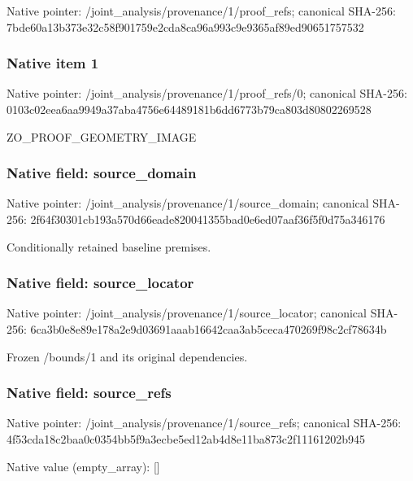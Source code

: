 \documentclass[10pt,a4paper]{article}
\begin{document}
Native pointer: /joint\_analysis/provenance/1/proof\_refs; canonical SHA-256: 7bde60a13b373e32c58f9017\allowbreak{}59e2cda8ca96a993c9e9365a\allowbreak{}f89ed90651757532



\subsubsection{Native item 1}


Native pointer: /joint\_analysis/provenan\allowbreak{}ce/1/proof\_refs/0; canonical SHA-256: 0103c02eea6aa9949a37aba4\allowbreak{}756e64489181b6dd6773b79c\allowbreak{}a803d80802269528


ZO\_PROOF\_GEOMETRY\_IMAGE


\subsubsection{Native field: source\_domain}


Native pointer: /joint\_analysis/provenan\allowbreak{}ce/1/source\_domain; canonical SHA-256: 2f64f30301cb193a570d66ea\allowbreak{}de820041355bad0e6ed07aaf\allowbreak{}36f5f0d75a346176


Conditionally retained baseline premises.


\subsubsection{Native field: source\_locator}


Native pointer: /joint\_analysis/provenan\allowbreak{}ce/1/source\_locator; canonical SHA-256: 6ca3b0e8e89e178a2e9d0369\allowbreak{}1aaab16642caa3ab5ceca470\allowbreak{}269f98c2cf78634b


Frozen /bounds/1 and its original dependencies.


\subsubsection{Native field: source\_refs}


Native pointer: /joint\_analysis/provenan\allowbreak{}ce/1/source\_refs; canonical SHA-256: 4f53cda18c2baa0c0354bb5f\allowbreak{}9a3ecbe5ed12ab4d8e11ba87\allowbreak{}3c2f11161202b945



Native value (empty\_array): []
\end{document}
